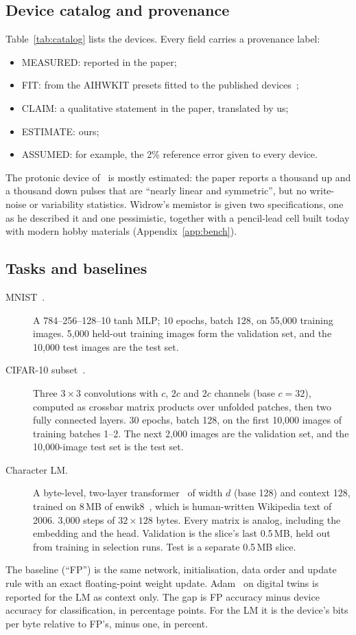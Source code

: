\subsection{Device catalog and provenance}\label{sec:catalog}
Table~\ref{tab:catalog} lists the devices. Every field carries a provenance label:
\begin{itemize}
\item MEASURED: reported in the paper;
\item FIT: from the AIHWKIT presets fitted to the published devices~\cite{rasch2021aihwkit};
\item CLAIM: a qualitative statement in the paper, translated by us;
\item ESTIMATE: ours;
\item ASSUMED: for example, the 2\% reference error given to every device.
\end{itemize}
The protonic device of~\cite{onen2022} is mostly estimated: the paper reports a thousand up and a thousand down pulses that are
``nearly linear and symmetric'', but no write-noise or variability statistics. Widrow's memistor is given two specifications,
one as he described it and one pessimistic, together with a pencil-lead cell built today with modern hobby materials
(Appendix~\ref{app:bench}).



\subsection{Tasks and baselines}\label{sec:tasks}
\begin{description}
\item[MNIST~\cite{lecun1998}.] A 784--256--128--10 tanh MLP; 10 epochs, batch 128, on 55{,}000 training images. 5{,}000 held-out
      training images form the validation set, and the 10{,}000 test images are the test set.
\item[CIFAR-10 subset~\cite{krizhevsky2009}.] Three $3\times3$ convolutions with $c$, $2c$ and $2c$ channels (base $c=32$),
      computed as crossbar matrix products over unfolded patches, then two fully connected layers. 30 epochs, batch 128, on the
      first 10{,}000 images of training batches 1--2. The next 2{,}000 images are the validation set, and the 10{,}000-image
      test set is the test set.
\item[Character LM.] A byte-level, two-layer transformer~\cite{vaswani2017} of width $d$ (base 128) and context 128, trained on
      8\,MB of enwik8~\cite{mahoney2011}, which is human-written Wikipedia text of 2006. 3{,}000 steps of $32\times128$ bytes.
      Every matrix is analog, including the embedding and the head. Validation is the slice's last 0.5\,MB, held out from
      training in selection runs. Test is a separate 0.5\,MB slice.
\end{description}
The baseline (``FP'') is the same network, initialisation, data order and update rule with an exact floating-point weight
update. Adam~\cite{kingma2014} on digital twins is reported for the LM as context only. The gap is FP accuracy minus device
accuracy for classification, in percentage points. For the LM it is the device's bits per byte relative to FP's, minus one, in
percent.

